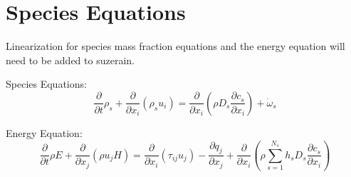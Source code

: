 \documentclass[10pt]{article}
\newcommand{\myred}[1]{{\color{red} #1}}
\begin{document}
\section{Species Equations}

Linearization for species mass fraction equations and the
energy equation will need to be added to suzerain. 

Species Equations:
\begin{equation}
 \frac{\partial}{\partial t} \rho_s + \frac{\partial}{\partial
  x_i}\left(\rho_s u_i\right) = \frac{\partial}{\partial x_i}\left(\rho D_s
  \frac{\partial c_s}{\partial x_i} \right) + \dot \omega_s
\end{equation}

Energy Equation:
\begin{equation}
\frac{\partial}{\partial t} \rho E + \frac{\partial }{\partial x_j}\left(\rho
u_j H\right) = \frac{\partial }{\partial x_i}\left(\tau_{ij}u_j\right) - \frac{\partial q_j
}{\partial x_j} + \frac{\partial }{\partial x_i}\left(\rho \sum^{N_s}_{s=1}
h_s D_s \frac{\partial c_s}{\partial x_i} \right)
\end{equation}



%
%
%
\end{document}

